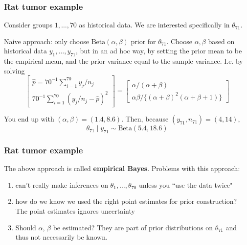 \documentclass{beamer}
\begin{document}
\begin{frame}
\frametitle{Rat tumor example}

Consider groups $1, \ldots, 70$ as historical data. We are interested specifically in $\theta_{71}$.
\newline

Naive approach: only choose $\text{Beta}(\alpha,\beta)$ prior for $\theta_{71}$. Choose $\alpha,\beta$ based on historical data $y_1, \ldots, y_{71}$, but in an ad hoc way, by setting the prior mean to be the empirical mean, and the prior variance equal to the sample variance. I.e. by solving
\[
\left[\begin{array}{c}
\hat{p} = 70^{-1}\sum_{i=1}^{70} y_j/n_j \\
70^{-1}\sum_{i=1}^{70} (y_j/n_j - \hat{p})^2
\end{array}\right]
=
\left[\begin{array}{c}
\alpha/(\alpha+\beta) \\
\alpha \beta / \{(\alpha+\beta)^2(\alpha + \beta + 1) \}
\end{array}\right]
\]

You end up with $(\alpha,\beta) = (1.4, 8.6)$. Then, because $(y_{71},n_{71}) = (4,14)$,
\[
\theta_{71} \mid y_{71} \sim \text{Beta}(5.4, 18.6)
\]

\end{frame}


\begin{frame}
\frametitle{Rat tumor example}

The above approach is called {\bf empirical Bayes}. Problems with this approach:

\begin{enumerate}
\item can't really make inferences on $\theta_1, \ldots, \theta_{70}$ unless you ``use the data twice"
\item how do we know we used the right point estimates for prior
  construction? The point estimates ignores uncertainty
\item Should $\alpha$, $\beta$ be estimated? They are part of prior
  distributions on $\theta_{71}$ and thus not necessarily be known.
\end{enumerate}


\end{frame}
\end{document}
